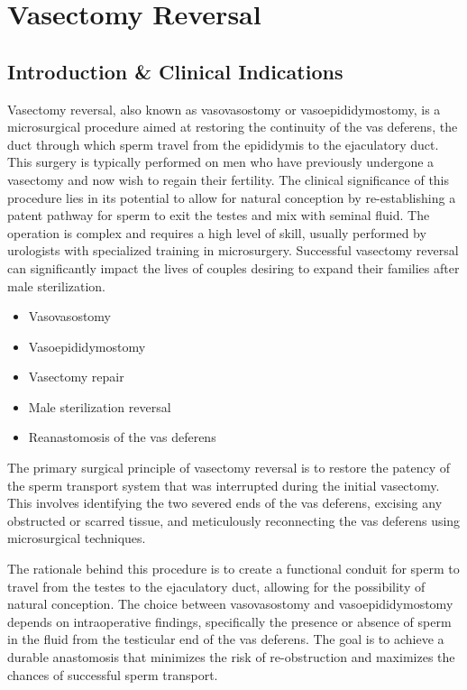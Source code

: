 \chapter{Vasectomy Reversal}

\section*{Introduction \& Clinical Indications}
Vasectomy reversal, also known as vasovasostomy or vasoepididymostomy, is a microsurgical procedure aimed at restoring the continuity of the vas deferens, the duct through which sperm travel from the epididymis to the ejaculatory duct. This surgery is typically performed on men who have previously undergone a vasectomy and now wish to regain their fertility. The clinical significance of this procedure lies in its potential to allow for natural conception by re-establishing a patent pathway for sperm to exit the testes and mix with seminal fluid. The operation is complex and requires a high level of skill, usually performed by urologists with specialized training in microsurgery. Successful vasectomy reversal can significantly impact the lives of couples desiring to expand their families after male sterilization.

\begin{itemize}
  \item Vasovasostomy
  \item Vasoepididymostomy
  \item Vasectomy repair
  \item Male sterilization reversal
  \item Reanastomosis of the vas deferens
\end{itemize}

The primary surgical principle of vasectomy reversal is to restore the patency of the sperm transport system that was interrupted during the initial vasectomy. This involves identifying the two severed ends of the vas deferens, excising any obstructed or scarred tissue, and meticulously reconnecting the vas deferens using microsurgical techniques. 

The rationale behind this procedure is to create a functional conduit for sperm to travel from the testes to the ejaculatory duct, allowing for the possibility of natural conception. The choice between vasovasostomy and vasoepididymostomy depends on intraoperative findings, specifically the presence or absence of sperm in the fluid from the testicular end of the vas deferens. The goal is to achieve a durable anastomosis that minimizes the risk of re-obstruction and maximizes the chances of successful sperm transport.

